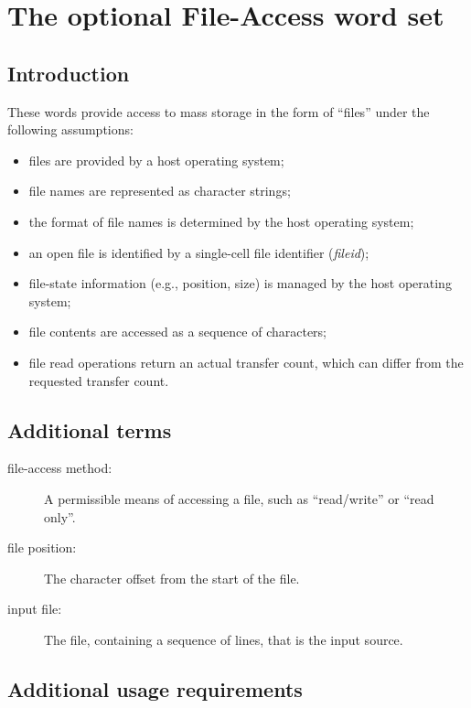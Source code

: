 
\chapter{The optional File-Access word set} %

\section{Introduction} %

These words provide access to mass storage in the form of ``files''
under the following assumptions:

\begin{itemize}
\item files are provided by a host operating system;
\item file names are represented as character strings;
\item the format of file names is determined by the host operating
	system;
\item an open file is identified by a single-cell file identifier
	(\emph{fileid});
\item file-state information (e.g., position, size) is managed by
	the host operating system;
\item file contents are accessed as a sequence of characters;
\item file read operations return an actual transfer count, which
	can differ from the requested transfer count.
\end{itemize}

\section{Additional terms} %

\begin{description}
\item[file-access method:]
	A permissible means of accessing a file, such as ``read/write''
	or ``read only''.
\item[file position:]
	The character offset from the start of the file.
\item[input file:]
	The file, containing a sequence of lines, that is the input source.
\end{description}

\section{Additional usage requirements} %

